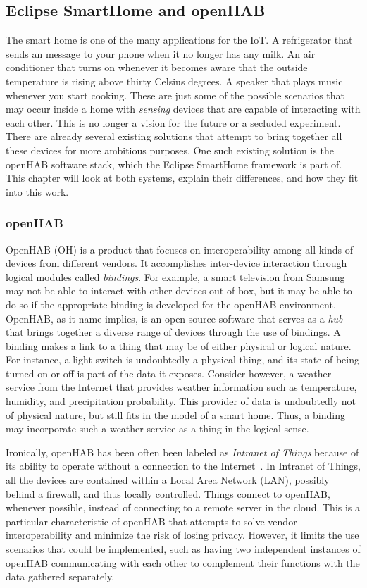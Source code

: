 \documentclass[12pt]{article}
\begin{document}
\subsection{Eclipse SmartHome and openHAB}

The smart home is one of the many applications for the IoT. A refrigerator that sends an message to your phone when it no longer has any milk. An air conditioner that turns on whenever it becomes aware that the outside temperature is rising above thirty Celsius degrees. A speaker that plays music whenever you start cooking. These are just some of the possible scenarios that may occur inside a home with \emph{sensing} devices that are capable of interacting with each other. This is no longer a vision for the future or a secluded experiment. There are already several existing solutions that attempt to bring together all these devices for more ambitious purposes. One such existing solution is the openHAB software stack, which the Eclipse SmartHome framework is part of. This chapter will look at both systems, explain their differences, and how they fit into this work. 

\subsubsection{openHAB}
\label{sssec:oh}
OpenHAB (OH) is a product that focuses on interoperability among all kinds of devices from different vendors. It accomplishes inter-device interaction through logical modules called \emph{bindings}. For example, a smart television from Samsung may not be able to interact with other devices out of box, but it may be able to do so if the appropriate binding is developed for the openHAB environment. OpenHAB, as it name implies, is an open-source software that serves as a \emph{hub} that brings together a diverse range of devices through the use of bindings. A binding makes a link to a thing that may be of either physical or logical nature. For instance, a light switch is undoubtedly a physical thing, and its state of being turned on or off is part of the data it exposes. Consider however, a weather service from the Internet that provides weather information such as temperature, humidity, and precipitation probability. This provider of data is undoubtedly not of physical nature, but still fits in the model of a smart home. Thus, a binding may incorporate such a weather service as a thing in the logical sense.

Ironically, openHAB has been often been labeled as \emph{Intranet of Things} because of its ability to operate without a connection to the Internet~\cite{openhab_03}. In Intranet of Things, all the devices are contained within a Local Area Network (LAN), possibly behind a firewall, and thus locally controlled. Things connect to openHAB, whenever possible, instead of connecting to a remote server in the cloud. This is a particular characteristic of openHAB that attempts to solve vendor interoperability and minimize the risk of losing privacy. However, it limits the use scenarios that could be implemented, such as having two independent instances of openHAB communicating with each other to complement their functions with the data gathered separately.
\end{document}
